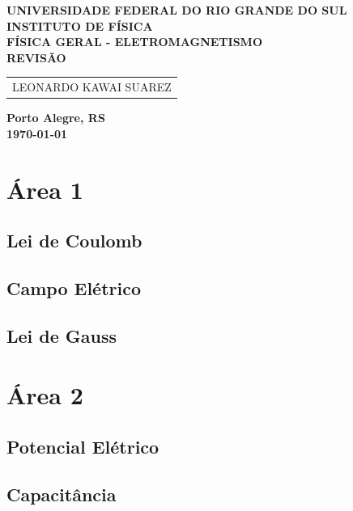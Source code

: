 \documentclass[12pt]{article}
\begin{document}
\begin{center}
    \textbf{\large UNIVERSIDADE FEDERAL DO RIO GRANDE DO SUL} \\
    \textbf{\large INSTITUTO DE FÍSICA} \\
    \vspace{3cm}
    \textbf{\Large FÍSICA GERAL - ELETROMAGNETISMO} \\
    \vspace{1cm}
    \textbf{\large REVISÃO} \\
    \vspace{3cm}
    
    \begin{tabular}{c}
        LEONARDO KAWAI SUAREZ        
    \end{tabular}
    
    \vfill
    \textbf{\large Porto Alegre, RS} \\
    \textbf{\large\today} \\
\end{center}\newpage

\tableofcontents\newpage

\section{Área 1}

\subsection{Lei de Coulomb}
\subsection{Campo Elétrico}
\subsection{Lei de Gauss}

\newpage

\section{Área 2}

\subsection{Potencial Elétrico}
\subsection{Capacitância}
\end{document}
